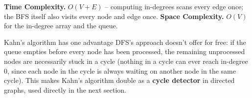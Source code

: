 \begin{complexitybox}
\textbf{Time Complexity.} $O(V+E)$ -- computing in-degrees scans every
edge once; the BFS itself also visits every node and edge once.
\textbf{Space Complexity.} $O(V)$ for the in-degree array and the
queue.
\end{complexitybox}

\begin{takeawaybox}
Kahn's algorithm has one advantage DFS's approach doesn't offer for
free: if the queue empties before every node has been processed, the
remaining unprocessed nodes are necessarily stuck in a cycle (nothing
in a cycle can ever reach in-degree $0$, since each node in the cycle
is always waiting on another node in the same cycle). This makes Kahn's
algorithm double as a \textbf{cycle detector} in directed graphs, used
directly in the next section.
\end{takeawaybox}
